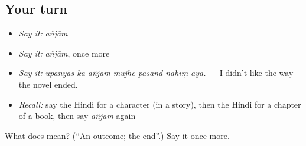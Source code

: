 \subsection*{Your turn}
\begin{itemize}
\raggedright
  \item \emph{Say it:} \emph{añjām}
  \item \emph{Say it:} \emph{añjām}, once more
  \item \emph{Say it:} \emph{upanyās kā añjām mujhe pasand nahīṃ āyā.} — I didn't like the way the novel ended.
  \item \emph{Recall:} say the Hindi for a character (in a story), then the Hindi for a chapter of a book, then say \emph{añjām} again
\end{itemize}

\begin{tcolorbox}[breakable,colback=teal!4,colframe=teal!35!black,title={Before you move on}]
What does  mean? (\textquotedblleft{}An outcome; the end\textquotedblright{}.) Say it once more.
\end{tcolorbox}
